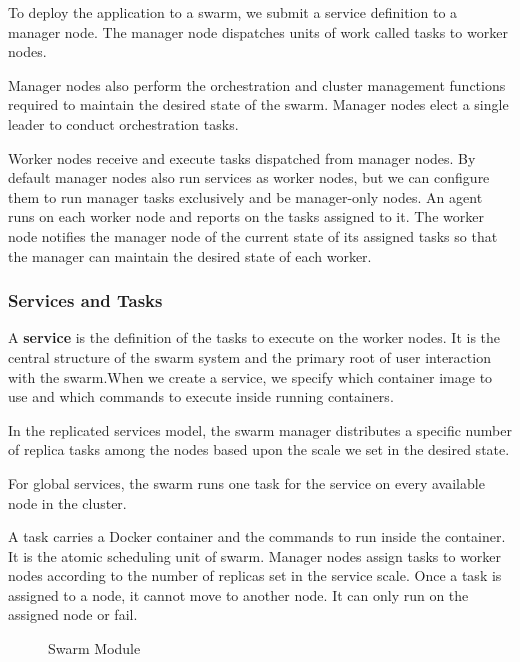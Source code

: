 \documentclass[9pt,twocolumn,twoside]{../../styles/osajnl}
\begin{document}
To deploy the  application to a swarm, we submit a service definition to a manager node. The manager node dispatches units of work called tasks to worker nodes.

Manager nodes also perform the orchestration and cluster management functions required to maintain the desired state of the swarm. Manager nodes elect a single leader to conduct orchestration tasks.

Worker nodes receive and execute tasks dispatched from manager nodes. By default manager nodes also run services as worker nodes, but we can configure them to run manager tasks exclusively and be manager-only nodes. An agent runs on each worker node and reports on the tasks assigned to it. The worker node notifies the manager node of the current state of its assigned tasks so that the manager can maintain the desired state of each worker.


\subsubsection{Services and Tasks}

A \textbf{service} is the definition of the tasks to execute on the worker nodes. It is the central structure of the swarm system and the primary root of user interaction with the swarm.When we create a service, we specify which container image to use and which commands to execute inside running containers.

In the replicated services model, the swarm manager distributes a specific number of replica tasks among the nodes based upon the scale we set in the desired state.

For global services, the swarm runs one task for the service on every available node in the cluster.

A task carries a Docker container and the commands to run inside the container. It is the atomic scheduling unit of swarm. Manager nodes assign tasks to worker nodes according to the number of replicas set in the service scale. Once a task is assigned to a node, it cannot move to another node. It can only run on the assigned node or fail.


\begin{figure}[h!]
\centering
{}
\caption{Swarm Module }
\label{fig:cmsswarm}
\end{figure}
\end{document}
